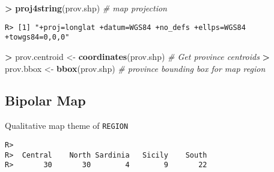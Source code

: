 \documentclass[
]{article}
\newenvironment{Shaded}{\begin{snugshade}}{\end{snugshade}}
\newcommand{\CommentTok}[1]{\textcolor[rgb]{0.56,0.35,0.01}{\textit{#1}}}
\newcommand{\DataTypeTok}[1]{\textcolor[rgb]{0.13,0.29,0.53}{#1}}
\newcommand{\DecValTok}[1]{\textcolor[rgb]{0.00,0.00,0.81}{#1}}
\newcommand{\FloatTok}[1]{\textcolor[rgb]{0.00,0.00,0.81}{#1}}
\newcommand{\KeywordTok}[1]{\textcolor[rgb]{0.13,0.29,0.53}{\textbf{#1}}}
\newcommand{\NormalTok}[1]{#1}
\newcommand{\OperatorTok}[1]{\textcolor[rgb]{0.81,0.36,0.00}{\textbf{#1}}}
\newcommand{\StringTok}[1]{\textcolor[rgb]{0.31,0.60,0.02}{#1}}
\begin{document}
\begin{Shaded}
\begin{Highlighting}[]
\OperatorTok{>}\StringTok{ }\KeywordTok{proj4string}\NormalTok{(prov.shp)                                    }\CommentTok{# map projection}
\end{Highlighting}
\end{Shaded}

\begin{verbatim}
R> [1] "+proj=longlat +datum=WGS84 +no_defs +ellps=WGS84 +towgs84=0,0,0"
\end{verbatim}

\begin{Shaded}
\begin{Highlighting}[]
\OperatorTok{>}\StringTok{ }\NormalTok{prov.centroid <-}\StringTok{ }\KeywordTok{coordinates}\NormalTok{(prov.shp)                   }\CommentTok{# Get province centroids}
\OperatorTok{>}\StringTok{ }\NormalTok{prov.bbox <-}\StringTok{ }\KeywordTok{bbox}\NormalTok{(prov.shp)                              }\CommentTok{# province bounding box for map region}
\end{Highlighting}
\end{Shaded}

\hypertarget{bipolar-map}{%
\subsection{Bipolar Map}\label{bipolar-map}}

Qualitative map theme of \texttt{REGION}

\begin{Shaded}
\end{Shaded}

\begin{verbatim}
R> 
R>  Central    North Sardinia   Sicily    South 
R>       30       30        4        9       22
\end{verbatim}

\begin{Shaded}
\end{Shaded}
\end{document}
